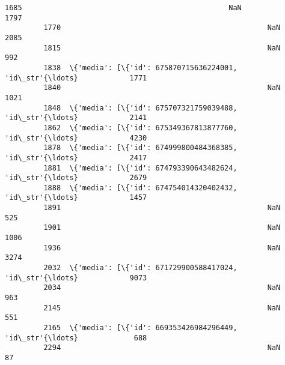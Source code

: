 \documentclass[11pt]{article}
\begin{document}
\begin{Verbatim}[commandchars=\\\{\}]
         1685                                                NaN            1797   
         1770                                                NaN            2085   
         1815                                                NaN             992   
         1838  \{'media': [\{'id': 675870715636224001, 'id\_str'{\ldots}            1771   
         1840                                                NaN            1021   
         1848  \{'media': [\{'id': 675707321759039488, 'id\_str'{\ldots}            2141   
         1862  \{'media': [\{'id': 675349367813877760, 'id\_str'{\ldots}            4230   
         1878  \{'media': [\{'id': 674999800484368385, 'id\_str'{\ldots}            2417   
         1881  \{'media': [\{'id': 674793390643482624, 'id\_str'{\ldots}            2679   
         1888  \{'media': [\{'id': 674754014320402432, 'id\_str'{\ldots}            1457   
         1891                                                NaN             525   
         1901                                                NaN            1006   
         1936                                                NaN            3274   
         2032  \{'media': [\{'id': 671729900588417024, 'id\_str'{\ldots}            9073   
         2034                                                NaN             963   
         2145                                                NaN             551   
         2165  \{'media': [\{'id': 669353426984296449, 'id\_str'{\ldots}             688   
         2294                                                NaN              87   
         

\end{Verbatim}
\end{document}
